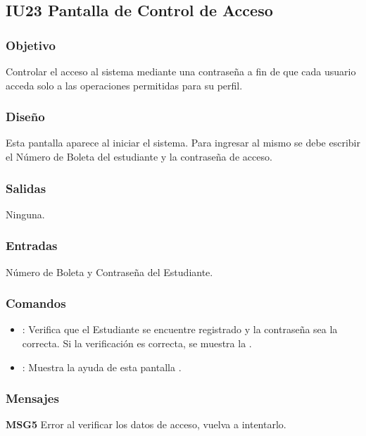 \subsection{IU23 Pantalla de Control de Acceso}

\subsubsection{Objetivo}
	Controlar el acceso al sistema mediante una contraseña a fin de que cada usuario acceda solo a las operaciones permitidas para su perfil.

\subsubsection{Diseño}
	Esta pantalla aparece al iniciar el sistema. Para ingresar al mismo se debe escribir el Número de Boleta del estudiante y la contraseña de acceso. 


\subsubsection{Salidas}

	Ninguna.

\subsubsection{Entradas}
Número de Boleta y Contraseña del Estudiante.

\subsubsection{Comandos}
\begin{itemize}
	\item {}: Verifica que el Estudiante se encuentre registrado y la contraseña sea la correcta. Si la verificación es correcta, se muestra la .
	\item {}: Muestra la ayuda de esta pantalla .
\end{itemize}

\subsubsection{Mensajes}
	\begin{Citemize}
		\item {\bf MSG5} Error al verificar los datos de acceso, vuelva a intentarlo.
	\end{Citemize}